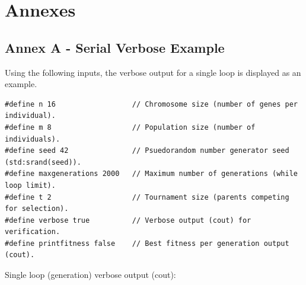 \documentclass{report}
\begin{document}
\newpage

\chapter*{Annexes}


\section*{Annex A - Serial Verbose Example}
Using the following inputs, the verbose output for a single loop is displayed as an example.
\begin{lstlisting}
#define n 16                  // Chromosome size (number of genes per individual).
#define m 8                   // Population size (number of individuals).
#define seed 42               // Psuedorandom number generator seed (std:srand(seed)).
#define maxgenerations 2000   // Maximum number of generations (while loop limit).
#define t 2                   // Tournament size (parents competing for selection).
#define verbose true          // Verbose output (cout) for verification.
#define printfitness false    // Best fitness per generation output (cout).
\end{lstlisting}
Single loop (generation) verbose output (cout):
\end{document}
